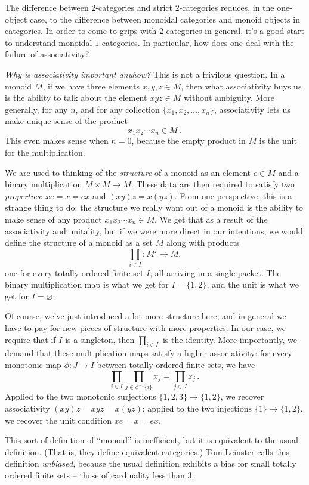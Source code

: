The difference between $2$-categories and strict $2$-categories reduces, in the one-object case, to the difference between monoidal categories and monoid objects in categories.
In order to come to grips with $2$-categories in general, it's a good start to understand monoidal $1$-categories.
In particular, how does one deal with the failure of associativity?

\emph{Why is associativity important anyhow?}
This is not a frivilous question.
In a monoid $M$, if we have three elements $x,y,z \in M$, then what associativity buys us is the ability to talk about the element $xyz \in M$ without ambiguity.
More generally, for any $n$, and for any collection $\{x_1,x_2,\dots,x_n\}$, associativity lets us make unique sense of the product
\[
  x_1 x_2 \cdots x_n \in M \period
\]
This even makes sense when $n = 0$, because the empty product in $M$ is the unit for the multiplication.

We are used to thinking of the \emph{structure} of a monoid as an element $e \in M$ and a binary multiplication $M \times M \to M$.
These data are then required to satisfy two \emph{properties}: $xe=x=ex$ and $(xy)z=x(yz)$.
From one perspective, this is a strange thing to do:
the structure we really want out of a monoid is the ability to make sense of any product $x_1 x_2 \cdots x_n \in M$.
We get that as a result of the associativity and unitality, but
if we were more direct in our intentions, we would define the structure of a monoid as a set $M$ along with products
\[
  \prod_{i \in I} \colon M^I \to M \comma
\]
one for every totally ordered finite set $I$, all arriving in a single packet.
The binary multiplication map is what we get for $I = \{1,2\}$, and the unit is what we get for $I = \varnothing$.

Of course, we've just introduced a lot more structure here, and
in general we have to pay for new pieces of structure with more properties.
In our case, we require that if $I$ is a singleton, then $\prod_{i \in I}$ is the identity.
More importantly, we demand that these multiplication maps satisfy a higher associativity:
for every monotonic map $\phi \colon J \to I$ between totally ordered finite sets, we have
\[
  \prod_{i \in I} \prod_{j \in \phi^{-1}\{i\}} x_j = \prod_{j \in J} x_j \period
\]
Applied to the two monotonic surjections $\{1,2,3\} \to \{1,2\}$, we recover associativity $(xy)z = xyz = x(yz)$;
applied to the two injections $\{1\} \to \{1,2\}$, we recover the unit condition $xe=x=ex$.

This sort of definition of \enquote{monoid} is inefficient, but
it is equivalent to the usual definition.
(That is, they define equivalent categories.)
Tom Leinster calls this definition \emph{unbiased}, because
the usual definition exhibits a bias for small totally ordered finite sets -- those of cardinality less than $3$.

